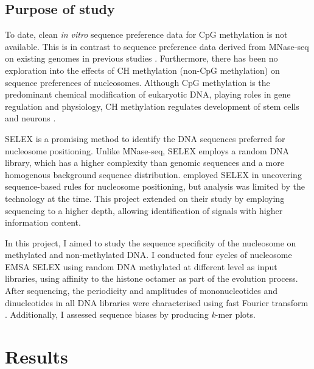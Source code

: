 \documentclass[parskip=full, numbers=noenddot]{scrbook}
\begin{document}
\subsection{Purpose of study}
\label{ssec:emsaselex_intro_why}

To date, clean \emph{in vitro} sequence preference data for CpG methylation is not available.  This is in contrast to sequence preference data derived from MNase-seq on existing genomes in previous studies \citep{struhl_determinants_2013, segal_genomic_2006, huff_dnmt1-independent_2014}.  Furthermore, there has been no exploration into the effects of CH methylation (non-CpG methylation) on sequence preferences of nucleosomes.  Although CpG methylation is the predominant chemical modification of eukaryotic DNA, playing roles in gene regulation and physiology, CH methylation regulates development of stem cells and neurons \citep{guo_distribution_2014}.

SELEX is a promising method to identify the DNA sequences preferred for nucleosome positioning.  Unlike MNase-seq, SELEX employs a random DNA library, which has a higher complexity than genomic sequences and a more homogenous background sequence distribution.  \citet{lowary_new_1998} employed SELEX in uncovering sequence-based rules for nucleosome positioning, but analysis was limited by the technology at the time.  This project extended on their study by employing sequencing to a higher depth, allowing identification of signals with higher information content.

In this project, I aimed to study the sequence specificity of the nucleosome on methylated and non-methylated DNA.  I conducted four cycles of nucleosome EMSA SELEX using random DNA methylated at different level as input libraries, using affinity to the histone octamer as part of the evolution process.  After sequencing, the periodicity and amplitudes of mononucleotides and dinucleotides in all DNA libraries were characterised using fast Fourier transform \citep{lowary_new_1998, zhu_interaction_2018}.  Additionally, I assessed sequence biases by producing \emph{k}-mer plots.

\section{Results}
\label{sec:emsaselex_results}
\end{document}
